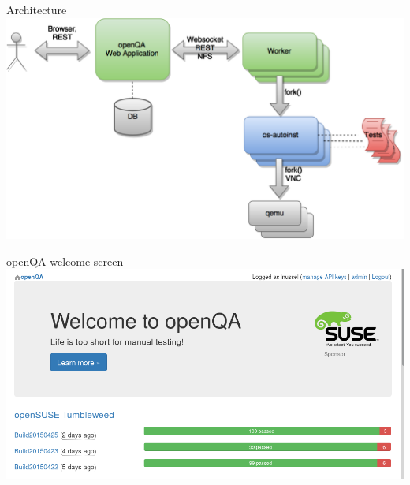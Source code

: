 \documentclass[
]{beamer}
\begin{document}
\begin{frame}{Architecture}
  \includegraphics[width=.8\paperwidth]{openqa_architecture}
\end{frame}


\begin{frame}{openQA welcome screen}
  \includegraphics[width=.8\paperwidth]{openqa.png}
\end{frame}
\end{document}
